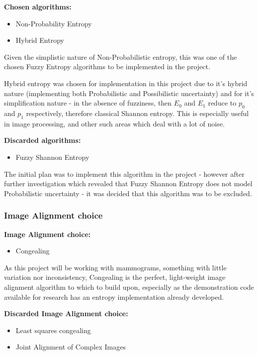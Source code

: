 \textbf{Chosen algorithms:}
\begin{itemize}
  \item Non-Probability Entropy
  \item Hybrid Entropy
\end{itemize}

Given the simplistic nature of Non-Probabilistic entropy, this was one of the chosen Fuzzy Entropy algorithms to be implemented in the project.

Hybrid entropy was chosen for implementation in this project due to it's hybrid nature (implementing both Probabilistic and Possibilistic uncertainty) and for it's simplification nature - in the absence of fuzziness, then $E_0$ and $E_1$ reduce to $p_0$ and $p_1$ respectively, therefore classical Shannon entropy. This is especially useful in image processing, and other such areas which deal with a lot of noise.

\textbf{Discarded algorithms:}
\begin{itemize}
  \item Fuzzy Shannon Entropy
\end{itemize}

The initial plan was to implement this algorithm in the project - however after further investigation which revealed that Fuzzy Shannon Entropy does not model Probabilistic uncertainty - it was decided that this algorithm was to be excluded.

\subsubsection{Image Alignment choice}

\textbf{Image Alignment choice:}
\begin{itemize}
    \item Congealing
\end{itemize}

As this project will be working with mammograms, something with little variation nor inconsistency, Congealing is the perfect, light-weight image alignment algorithm to which to build upon, especially as the demonstration code available for research has an entropy implementation already developed.

\textbf{Discarded Image Alignment choice:}
\begin{itemize}
    \item Least squares congealing
    \item Joint Alignment of Complex Images
\end{itemize}

